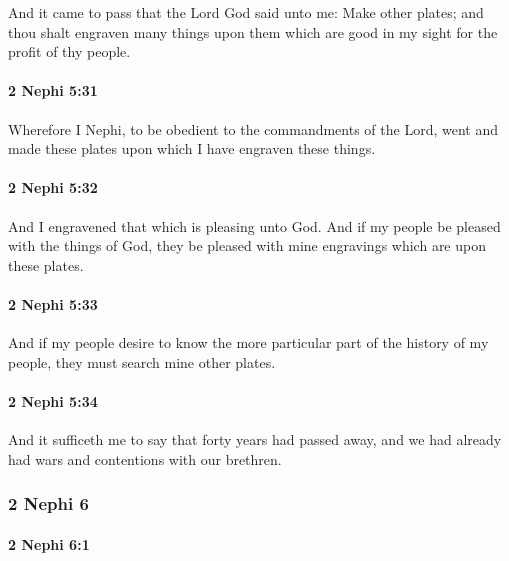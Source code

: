 			And it came to pass that the Lord God said unto me:
			Make other plates;
			and thou shalt engraven many things upon them
			which are good in my sight for the profit of thy people.

		\paragraph{2 Nephi 5:31} %
			\label{2NEPHI-5-31}

			Wherefore I Nephi, to be obedient to the commandments of the Lord,
			went and made these plates upon which I have engraven these things.

		\paragraph{2 Nephi 5:32} %
			\label{2NEPHI-5-32}

			And I engravened that which is pleasing unto God.
			And if my people be pleased with the things of God,
			they be pleased with mine engravings which are upon these plates.

		\paragraph{2 Nephi 5:33} %
			\label{2NEPHI-5-33}

			And if my people desire to know the more particular part
			of the history of my people,
			they must search mine other plates.

		\paragraph{2 Nephi 5:34} %
			\label{2NEPHI-5-34}

			And it sufficeth me to say that forty years had passed away,
			and we had already had wars and contentions with our brethren.

	\subsubsection{2 Nephi 6} %
		\label{2NEPHI-6}
		
		\paragraph{2 Nephi 6:1} %
			\label{2NEPHI-6-1}

